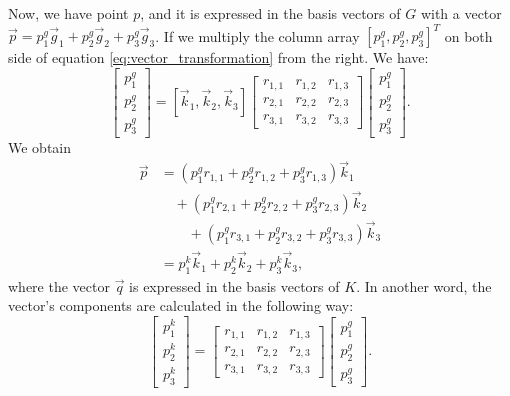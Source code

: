 \documentclass{article}
\begin{document}
Now, we have point $p$, and it is expressed in the basis vectors of $G$ with a vector $\vec{p} = p^g_1\vec{g}_1 + p^g_2\vec{g}_2 + p^g_3\vec{g}_3$. If we multiply the column array $[p^g_1, p^g_2, p^g_3]^T$ on both side of equation \ref{eq:vector_transformation} from the right. We have:
\begin{equation}
    [\vec{g}_1, \vec{g}_2, \vec{g}_3] \begin{bmatrix}
      p^g_1 \\
      p^g_2\\
      p^g_3
    \end{bmatrix}
    = [\vec{k}_1, \vec{k}_2, \vec{k}_3]
    \begin{bmatrix}
      r_{1,1} & r_{1,2} & r_{1,3} \\
      r_{2,1} & r_{2,2} & r_{2,3} \\
      r_{3,1} & r_{3,2} & r_{3,3}
    \end{bmatrix}
    \begin{bmatrix}
      p^g_1 \\
      p^g_2\\
      p^g_3
    \end{bmatrix}.
    \label{eq:change_coordinate}
\end{equation}
We obtain
\begin{equation*}
\begin{split}
\vec{p} & = (p^g_1r_{1,1} + p^g_2r_{1,2} + p^g_3r_{1,3})\vec{k}_1 \\
 & \quad + (p^g_1r_{2,1}+p^g_2r_{2,2}+p^g_3r_{2,3})\vec{k}_2 \\
 & \quad \quad + (p^g_1r_{3,1}+p^g_2r_{3,2}+p^g_3r_{3,3})\vec{k}_3 \\
 & = p^k_1\vec{k}_1 + p^k_2\vec{k}_2 + p^k_3\vec{k}_3,
\end{split}
\end{equation*}
where the vector $\vec{q}$ is expressed in the basis vectors of $K$. In another word, the vector's components are calculated in the following way: 
\begin{equation*}
\begin{bmatrix}
      p^k_1 \\
      p^k_2\\
      p^k_3
\end{bmatrix}
    =
    \begin{bmatrix}
      r_{1,1} & r_{1,2} & r_{1,3} \\
      r_{2,1} & r_{2,2} & r_{2,3} \\
      r_{3,1} & r_{3,2} & r_{3,3}
    \end{bmatrix}
    \begin{bmatrix}
      p^g_1 \\
      p^g_2\\
      p^g_3
    \end{bmatrix}.
\end{equation*}
\end{document}
